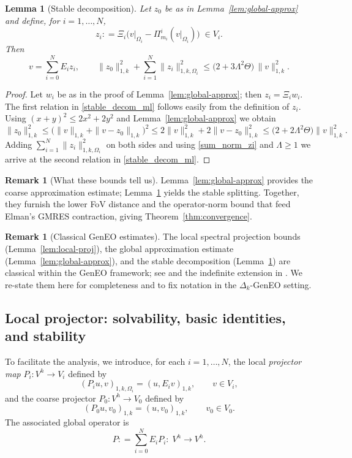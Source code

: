 \documentclass[preprint,3p,times]{elsarticle}
\newcommand{\assign}{\mathrel{\mathop:}=}
\newtheorem{lemma}[theorem]{Lemma}
\theoremstyle{definition}
\newtheorem{remark}[theorem]{Remark}
\numberwithin{equation}{section}
\begin{document}
\begin{lemma}[Stable decomposition]
\label{lem:stable-decomp}
Let $z_0$ be as in Lemma~\ref{lem:global-approx} and define, for $i=1,\dots,N$,
\[
	z_i \assign \Xi_i\bigl(v|_{\Omega_i} - \Pi_{m_i}^i(v|_{\Omega_i})\bigr) \;\in V_i.
\]
Then
\begin{equation}\label{stable_decom_ml}
	v = \sum_{i=0}^N E_i z_i,
	\qquad
	\|z_0\|_{1,k}^2 + \sum_{i=1}^N \|z_i\|_{1, k, \Omega_i}^2
	\le \bigl(2+3\Lambda^2\Theta\bigr)\,\|v\|_{1, k}^2.
\end{equation}
\end{lemma}

\begin{proof}
Let $w_i$ be as in the proof of Lemma~\ref{lem:global-approx}; then $z_i=\Xi_i w_i$.
The first relation in \eqref{stable_decom_ml} follows easily from the definition of $z_i$.
Using $(x+y)^2\le 2x^2+2y^2$ and Lemma~\ref{lem:global-approx} we obtain
\[
	\|z_0\|_{1,k}^2 \le \bigl(\|v\|_{1,k}+\|v-z_0\|_{1,k}\bigr)^2
	\le 2\|v\|_{1,k}^2 + 2\|v-z_0\|_{1,k}^2
	\le \bigl(2+2\Lambda^2\Theta\bigr)\|v\|_{1,k}^2.
\]
Adding $\sum_{i=1}^N \|z_i\|_{1,k,\Omega_i}^2$ on both sides and using \eqref{sum_norm_zi} and $\Lambda\ge1$
we arrive at the second relation in \eqref{stable_decom_ml}.
\end{proof}

\begin{remark}[What these bounds tell us]
Lemma~\ref{lem:global-approx} provides the coarse approximation estimate; Lemma~\ref{lem:stable-decomp} yields the stable splitting. 
Together, they furnish the lower FoV distance and the operator-norm bound that feed Elman's GMRES contraction, giving Theorem~\ref{thm:convergence}.
\end{remark}

\begin{remark}[Classical GenEO estimates]
The local spectral projection bounds (Lemma~\ref{lem:local-proj}), the global approximation
estimate (Lemma~\ref{lem:global-approx}), and the stable decomposition
(Lemma~\ref{lem:stable-decomp}) are classical within the GenEO framework; see
\cite{Spillane:2014:ARC} and the indefinite extension in \cite{Bootland:2022:OSM}.
We re-state them here for completeness and to fix notation in the $\Delta_k$-GenEO setting.
\end{remark}

\subsection{Local projector: solvability, basic identities, and stability}
To facilitate the analysis, we introduce, for each $i=1,\dots,N$, the local \emph{projector map}
$P_i:V^h\to V_i$ defined by
\begin{equation}\label{eq:proj_ritz_local}
	(P_i u, v)_{1, k, \Omega_i} = (u,E_i v)_{1, k}, \qquad v\in V_i,
\end{equation}
and the coarse projector $P_0:V^h\to V_0$ defined by
\begin{equation}\label{eq:proj_ritz_coarse}
	(P_0 u, v_0)_{1, k} = (u,v_0)_{1, k}, \qquad v_0\in V_0 .
\end{equation}
The associated global operator is
\[
	P \assign \sum_{i=0}^N E_i P_i :\; V^h \to V^h .
\]
\end{document}
